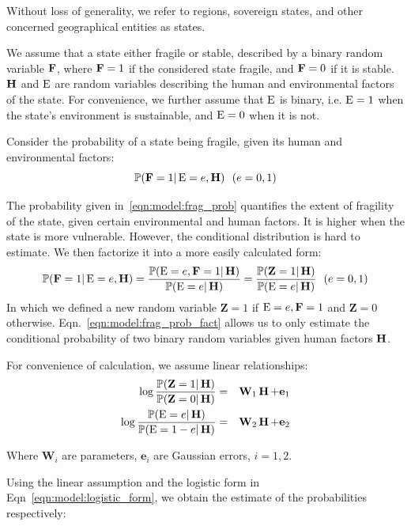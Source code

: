 Without loss of generality, we refer to regions, sovereign states, and other concerned geographical entities as states.

We assume that a state either fragile or stable, described by a binary random variable $\operatorname*{\mathbf{F}}$, where $\operatorname*{\mathbf{F}}=1$ if the considered state fragile, and $\operatorname*{\mathbf{F}}=0$ if it is stable. $\operatorname*{\mathbf{H}}$ and $\operatorname*{E}$ are random variables describing the human and environmental factors of the state. For convenience, we further assume that $\operatorname*{E}$ is binary, i.e. $\operatorname*{E}=1$ when the state's environment is sustainable, and $\operatorname*{E}=0$ when it is not. 

Consider the probability of a state being fragile, given its human and environmental factors:
\begin{equation}
    \mathbb P{(\operatorname*{\mathbf{F}}=1|\operatorname*{E}=e, \operatorname*{\mathbf{H}})} \ \ (e=0,1)
\label{eqn:model:frag_prob}
\end{equation}

The probability given in~\ref{eqn:model:frag_prob} quantifies the extent of fragility of the state, given certain environmental and human factors. It is higher when the state is more vulnerable. However, the conditional distribution is hard to estimate. We then factorize it into a more easily calculated form: 
\begin{equation}
    \mathbb P(\operatorname*{\mathbf{F}}=1|\operatorname*{E}=e,\operatorname*{\mathbf{H}})= \frac{\mathbb P(\operatorname*{E}=e, \operatorname*{\mathbf{F}}=1 | \operatorname*{\mathbf{H}})}{\mathbb P(\operatorname*{E}=e | \operatorname*{\mathbf{H}})} = \frac{\mathbb P(\mathbf{Z}=1|\operatorname*{\mathbf{H}})}{\mathbb P(\operatorname*{E}=e|\operatorname*{\mathbf{H}})}\ \ (e = 0,1)
    \label{eqn:model:frag_prob_fact}
\end{equation}
In which we defined a new random variable $\mathbf{Z}=1$ if $\operatorname*{E}=e,\operatorname*{\mathbf{F}}=1$ and $\mathbf{Z}=0$ otherwise.
Eqn.~\ref{eqn:model:frag_prob_fact} allows us to only estimate the conditional probability of two binary random variables given human factors $\operatorname*{\mathbf{H}}$.

For convenience of calculation, we assume linear relationships: 
\begin{eqnarray}
   \log\frac{\mathbb P(\mathbf{Z}=1|\operatorname*{\mathbf{H}})}{\mathbb P(\mathbf{Z}=0|\operatorname*{\mathbf{H}})} & = & \mathbf{W}_1\operatorname*{\mathbf{H}} + \mathbf{e}_1 \nonumber \\
   \log\frac{\mathbb P(\mathbf{\operatorname*{E}}=e|\operatorname*{\mathbf{H}})}{\mathbb P(\mathbf{\operatorname*{E}}=1-e|\operatorname*{\mathbf{H}})} & = & \mathbf{W}_2\operatorname*{\mathbf{H}} + \mathbf{e}_2 
   \label{eqn:model:logistic_form}
\end{eqnarray}

Where $\mathbf{W}_i$ are parameters, $\mathbf{e}_i$ are Gaussian errors, $i=1,2$.

Using the linear assumption and the logistic form in Eqn~\ref{eqn:model:logistic_form}, we obtain the estimate of the probabilities respectively:

